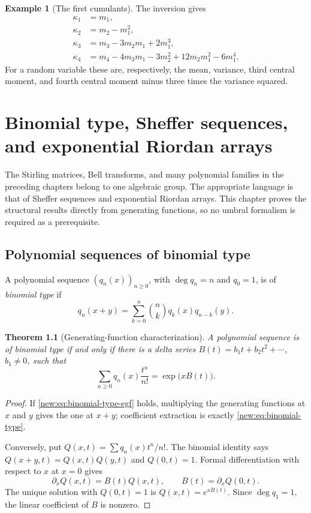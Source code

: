 \documentclass[11pt,a4paper,oneside,openany]{book}
\newtheorem{theorem}{Theorem}[chapter]
\theoremstyle{definition}
\newtheorem{example}[theorem]{Example}
\theoremstyle{remark}
\begin{document}
\begin{example}[The first cumulants]
The inversion gives
\begin{align*}
 \kappa_1&=m_1,\\
 \kappa_2&=m_2-m_1^2,\\
 \kappa_3&=m_3-3m_2m_1+2m_1^3,\\
 \kappa_4&=m_4-4m_3m_1-3m_2^2+12m_2m_1^2-6m_1^4.
\end{align*}
For a random variable these are, respectively, the mean, variance, third
central moment, and fourth central moment minus three times the variance
squared.
\end{example}

\chapter{Binomial type, Sheffer sequences, and exponential Riordan arrays}
\label{ch:sheffer-riordan}

The Stirling matrices, Bell transforms, and many polynomial families in the
preceding chapters belong to one algebraic group.  The appropriate language is
that of Sheffer sequences and exponential Riordan arrays.  This chapter proves
the structural results directly from generating functions, so no umbral
formalism is required as a prerequisite.

\section{Polynomial sequences of binomial type}

A polynomial sequence $(q_n(x))_{n\ge0}$, with $\deg q_n=n$ and $q_0=1$, is of
\emph{binomial type} if
\begin{equation}
 q_n(x+y)=\sum_{k=0}^n\binom nk q_k(x)q_{n-k}(y).
 \label{new:eq:binomial-type}
\end{equation}

\begin{theorem}[Generating-function characterization]
A polynomial sequence is of binomial type if and only if there is a delta
series $B(t)=b_1t+b_2t^2+\cdots$, $b_1\ne0$, such that
\begin{equation}
 \sum_{n\ge0}q_n(x)\frac{t^n}{n!}=\exp\bigl(xB(t)\bigr).
 \label{new:eq:binomial-type-egf}
\end{equation}
\end{theorem}

\begin{proof}
If \eqref{new:eq:binomial-type-egf} holds, multiplying the generating functions
at $x$ and $y$ gives the one at $x+y$; coefficient extraction is exactly
\eqref{new:eq:binomial-type}.

Conversely, put $Q(x,t)=\sum q_n(x)t^n/n!$.  The binomial identity says
$Q(x+y,t)=Q(x,t)Q(y,t)$ and $Q(0,t)=1$.  Formal differentiation with respect to
$x$ at $x=0$ gives
\[
 \partial_xQ(x,t)=B(t)Q(x,t),
 \qquad B(t)=\partial_xQ(0,t).
\]
The unique solution with $Q(0,t)=1$ is $Q(x,t)=e^{xB(t)}$.  Since
$\deg q_1=1$, the linear coefficient of $B$ is nonzero.
\end{proof}
\end{document}
